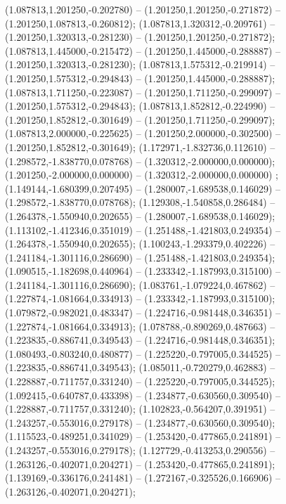  (1.087813,1.201250,-0.202780) -- (1.201250,1.201250,-0.271872) -- (1.201250,1.087813,-0.260812);
 (1.087813,1.320312,-0.209761) -- (1.201250,1.320313,-0.281230) -- (1.201250,1.201250,-0.271872);
 (1.087813,1.445000,-0.215472) -- (1.201250,1.445000,-0.288887) -- (1.201250,1.320313,-0.281230);
 (1.087813,1.575312,-0.219914) -- (1.201250,1.575312,-0.294843) -- (1.201250,1.445000,-0.288887);
 (1.087813,1.711250,-0.223087) -- (1.201250,1.711250,-0.299097) -- (1.201250,1.575312,-0.294843);
 (1.087813,1.852812,-0.224990) -- (1.201250,1.852812,-0.301649) -- (1.201250,1.711250,-0.299097);
 (1.087813,2.000000,-0.225625) -- (1.201250,2.000000,-0.302500) -- (1.201250,1.852812,-0.301649);
 (1.172971,-1.832736,0.112610) -- (1.298572,-1.838770,0.078768) -- (1.320312,-2.000000,0.000000);
 (1.201250,-2.000000,0.000000) -- (1.320312,-2.000000,0.000000) ;
 (1.149144,-1.680399,0.207495) -- (1.280007,-1.689538,0.146029) -- (1.298572,-1.838770,0.078768);
 (1.129308,-1.540858,0.286484) -- (1.264378,-1.550940,0.202655) -- (1.280007,-1.689538,0.146029);
 (1.113102,-1.412346,0.351019) -- (1.251488,-1.421803,0.249354) -- (1.264378,-1.550940,0.202655);
 (1.100243,-1.293379,0.402226) -- (1.241184,-1.301116,0.286690) -- (1.251488,-1.421803,0.249354);
 (1.090515,-1.182698,0.440964) -- (1.233342,-1.187993,0.315100) -- (1.241184,-1.301116,0.286690);
 (1.083761,-1.079224,0.467862) -- (1.227874,-1.081664,0.334913) -- (1.233342,-1.187993,0.315100);
 (1.079872,-0.982021,0.483347) -- (1.224716,-0.981448,0.346351) -- (1.227874,-1.081664,0.334913);
 (1.078788,-0.890269,0.487663) -- (1.223835,-0.886741,0.349543) -- (1.224716,-0.981448,0.346351);
 (1.080493,-0.803240,0.480877) -- (1.225220,-0.797005,0.344525) -- (1.223835,-0.886741,0.349543);
 (1.085011,-0.720279,0.462883) -- (1.228887,-0.711757,0.331240) -- (1.225220,-0.797005,0.344525);
 (1.092415,-0.640787,0.433398) -- (1.234877,-0.630560,0.309540) -- (1.228887,-0.711757,0.331240);
 (1.102823,-0.564207,0.391951) -- (1.243257,-0.553016,0.279178) -- (1.234877,-0.630560,0.309540);
 (1.115523,-0.489251,0.341029) -- (1.253420,-0.477865,0.241891) -- (1.243257,-0.553016,0.279178);
 (1.127729,-0.413253,0.290556) -- (1.263126,-0.402071,0.204271) -- (1.253420,-0.477865,0.241891);
 (1.139169,-0.336176,0.241481) -- (1.272167,-0.325526,0.166906) -- (1.263126,-0.402071,0.204271);
